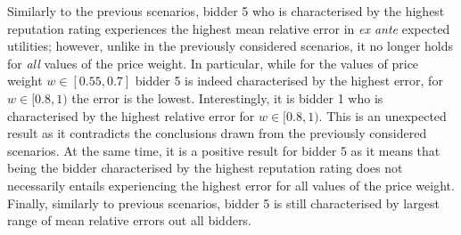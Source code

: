 Similarly to the previous scenarios, bidder 5 who is characterised by the highest reputation rating experiences the highest mean relative error in \emph{ex ante} expected utilities; however, unlike in the previously considered scenarios, it no longer holds for \emph{all} values of the price weight. In particular, while for the values of price weight $w\in [0.55, 0.7]$ bidder 5 is indeed characterised by the highest error, for $w\in [0.8, 1)$ the error is the lowest. Interestingly, it is bidder 1 who is characterised by the highest relative error for $w\in [0.8, 1)$. This is an unexpected result as it contradicts the conclusions drawn from the previously considered scenarios. At the same time, it is a positive result for bidder 5 as it means that being the bidder characterised by the highest reputation rating does not necessarily entails experiencing the highest error for all values of the price weight. Finally, similarly to previous scenarios, bidder 5 is still characterised by largest range of mean relative errors out all bidders.

